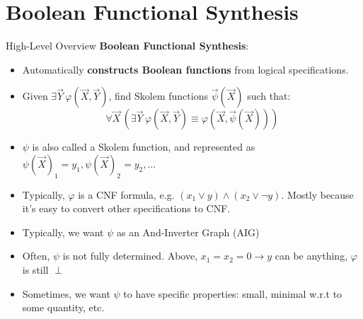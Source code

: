 \documentclass[aspectratio=169]{beamer}
\begin{document}
\section{Boolean Functional Synthesis}
\begin{frame}{High-Level Overview}
  \textbf{Boolean Functional Synthesis}:
  \begin{itemize}
    \item Automatically \textbf{constructs Boolean functions} from logical
        specifications.
    \item Given \(\exists \vec{Y}\, \varphi(\vec{X}, \vec{Y})\),
        find Skolem functions \(\vec{\psi}(\vec{X})\) such that:
        \[
            \forall \vec{X}\, \left( \exists \vec{Y}\, \varphi(\vec{X}, \vec{Y}) \equiv \varphi(\vec{X}, \vec{\psi}(\vec{X})) \right)
        \]
    \item $\psi$ is also called a Skolem function, and represented as
        $\psi(\vec{X})_1 = y_1, \psi(\vec{X})_2 = y_2, \ldots$
    \item Typically, $\varphi$ is a CNF formula, e.g. $(x_1 \lor y) \land (x_2
        \lor \neg y)$. Mostly because it's easy to convert other specifications
        to CNF.
    \item Typically, we want $\psi$ as an And-Inverter Graph (AIG)
    \item Often, $\psi$ is not fully determined. Above, $x_1 = x_2 = 0
        \rightarrow y$ can be anything, $\varphi$ is still $\perp$
    \item Sometimes, we want $\psi$ to have specific properties: small, minimal
        w.r.t to some quantity, etc.
\end{itemize}
\end{frame}
\end{document}
